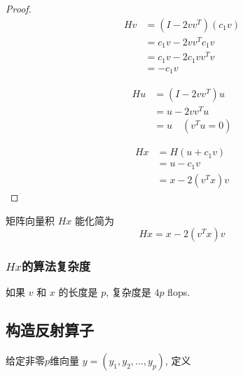 \begin{proof}
    \begin{equation}\begin{aligned}
        Hv &= (I-2 v v^{T}) (c_1 v) \\
        &= c_1 v - 2 v v^T c_1 v \\
        & = c_1 v - 2 c_1 v v^T v \\
        & = -c_1 v
    \end{aligned}\end{equation}

    \begin{equation}\begin{aligned}
        Hu &= (I - 2 v v^T) u \\
        &= u - 2 v v^T u \\
        & = u \quad (v^T u = 0) 
    \end{aligned}\end{equation}

    \begin{equation}\begin{aligned}
        Hx &= H(u + c_1v) \\
        &= u - c_1 v \\
        &= x - 2(v^Tx)v
    \end{aligned}\end{equation}
\end{proof}

\begin{corollary}
    矩阵向量积 $ H x $ 能化简为
\begin{equation}
H x=x-2\left(v^{T} x\right) v
\end{equation}
\end{corollary}


\subsubsection{$Hx$的算法复杂度}

    如果 $ v $ 和 $ x $ 的长度是 $ p $, 复杂度是 $ 4 p $ flops.


\subsection{构造反射算子}

给定非零$p$维向量 $ y=\left(y_{1}, y_{2}, \ldots, y_{p}\right) $, 定义

